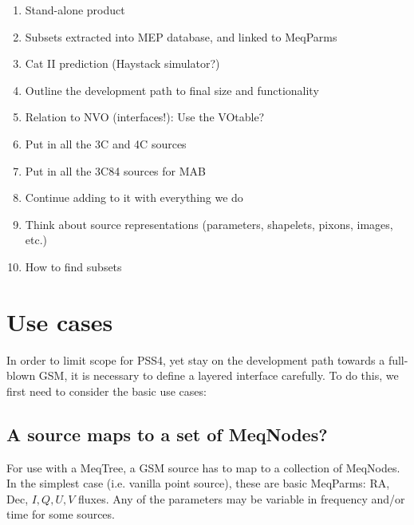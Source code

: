 \documentclass[]{lofar}
\begin{document}
  \begin{enumerate}
  
  \item Stand-alone product
  
  \item Subsets extracted into MEP database, and linked to MeqParms
  
  \item Cat II prediction (Haystack simulator?)
  
  \item Outline the development path to final size and functionality
  
  \item Relation to NVO (interfaces!): Use the VOtable?
  
  \item Put in all the 3C and 4C sources
  
  \item Put in all the 3C84 sources for MAB
  
  \item Continue adding to it with everything we do
  
  \item Think about source representations (parameters, shapelets, pixons, images, etc.)
  
  \item How to find subsets
  
  \end{enumerate}
  
\section{Use cases}
  
  In order to limit scope for PSS4, yet stay on the development path towards a
  full-blown GSM, it is necessary to define a layered interface carefully. To
  do this, we first need to consider the basic use cases:

\subsection{A source maps to a set of MeqNodes?} 
\label{sec:sourcetomeqnodes}
  
  For use with a MeqTree, a GSM source has to map to a collection of MeqNodes.
  In the simplest case (i.e. vanilla point source), these are basic MeqParms:
  RA, Dec, $I,Q,U,V$ fluxes. Any of the parameters may be variable in frequency
  and/or time for some sources.
\end{document}
